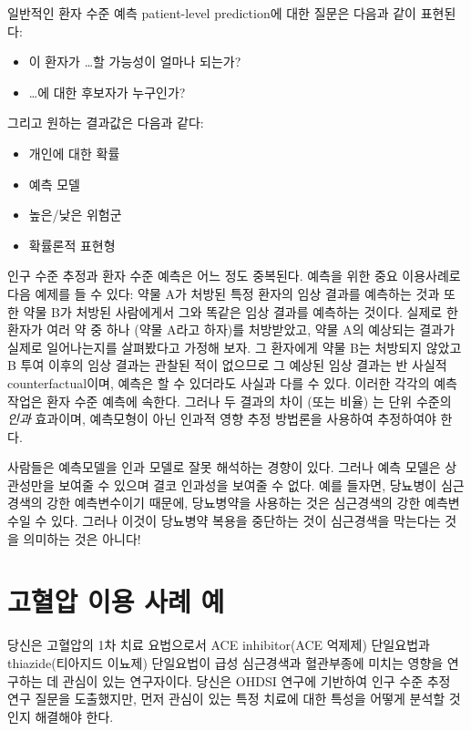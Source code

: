 \documentclass[10.5pt]{book}
\providecommand{\tightlist}{%
  \setlength{\itemsep}{0pt}\setlength{\parskip}{0pt}}
\theoremstyle{definition}
\theoremstyle{definition}
\theoremstyle{definition}
\theoremstyle{remark}
\let\BeginKnitrBlock\begin \let\EndKnitrBlock\end
\begin{document}
일반적인 환자 수준 예측 patient-level prediction에 대한 질문은 다음과
같이 표현된다:

\begin{itemize}
\tightlist
\item
  이 환자가 \ldots{}할 가능성이 얼마나 되는가?
\item
  \ldots{}에 대한 후보자가 누구인가?
\end{itemize}

그리고 원하는 결과값은 다음과 같다:

\begin{itemize}
\tightlist
\item
  개인에 대한 확률
\item
  예측 모델
\item
  높은/낮은 위험군
\item
  확률론적 표현형
\end{itemize}

인구 수준 추정과 환자 수준 예측은 어느 정도 중복된다. 예측을 위한 중요
이용사례로 다음 예제를 들 수 있다: 약물 A가 처방된 특정 환자의 임상
결과를 예측하는 것과 또한 약물 B가 처방된 사람에게서 그와 똑같은 임상
결과를 예측하는 것이다. 실제로 한 환자가 여러 약 중 하나 (약물 A라고
하자)를 처방받았고, 약물 A의 예상되는 결과가 실제로 일어나는지를
살펴봤다고 가정해 보자. 그 환자에게 약물 B는 처방되지 않았고 B 투여
이후의 임상 결과는 관찰된 적이 없으므로 그 예상된 임상 결과는 반 사실적
counterfactual이며, 예측은 할 수 있더라도 사실과 다를 수 있다. 이러한
각각의 예측 작업은 환자 수준 예측에 속한다. 그러나 두 결과의 차이 (또는
비율) 는 단위 수준의 \emph{인과} 효과이며, 예측모형이 아닌 인과적 영향
추정 방법론을 사용하여 추정하여야 한다.

\BeginKnitrBlock{rmdimportant}
사람들은 예측모델을 인과 모델로 잘못 해석하는 경향이 있다. 그러나 예측
모델은 상관성만을 보여줄 수 있으며 결코 인과성을 보여줄 수 없다. 예를
들자면, 당뇨병이 심근경색의 강한 예측변수이기 때문에, 당뇨병약을
사용하는 것은 심근경색의 강한 예측변수일 수 있다. 그러나 이것이 당뇨병약
복용을 중단하는 것이 심근경색을 막는다는 것을 의미하는 것은 아니다!
\EndKnitrBlock{rmdimportant}

\section{고혈압 이용 사례 예}\label{---}

당신은 고혈압의 1차 치료 요법으로서 ACE inhibitor(ACE 억제제) 단일요법과
thiazide(티아지드 이뇨제) 단일요법이 급성 심근경색과 혈관부종에 미치는
영향을 연구하는 데 관심이 있는 연구자이다. 당신은 OHDSI 연구에 기반하여
인구 수준 추정 연구 질문을 도출했지만, 먼저 관심이 있는 특정 치료에 대한
특성을 어떻게 분석할 것인지 해결해야 한다.
\end{document}

